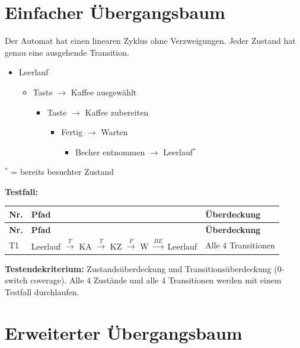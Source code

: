 \documentclass[
	fontsize=12pt,          %
	paper=a4,               %
	numbers=noenddot,       %
	listof=totoc,           %
	listof=entryprefix,     %
	listof=nochaptergap,    %
	bibliography=totoc,     %
	parskip=half,           %
	openany                 %
]{scrbook}
\begin{document}
\section*{Einfacher Übergangsbaum}

Der Automat hat einen linearen Zyklus ohne Verzweigungen.
Jeder Zustand hat genau eine ausgehende Transition.

\begin{itemize}
	\item Leerlauf
	\begin{itemize}
		\item Taste $\rightarrow$ Kaffee ausgewählt
		\begin{itemize}
			\item Taste $\rightarrow$ Kaffee zubereiten
			\begin{itemize}
				\item Fertig $\rightarrow$ Warten
				\begin{itemize}
					\item Becher entnommen $\rightarrow$ Leerlauf$^*$
				\end{itemize}
			\end{itemize}
		\end{itemize}
	\end{itemize}
\end{itemize}

$^*$ = bereits besuchter Zustand

\textbf{Testfall:}

\begin{longtable}{| p{0.5cm} | p{8.0cm} | p{3.5cm} |}
	\hline
	\textbf{Nr.} & \textbf{Pfad} & \textbf{Überdeckung} \\ \hline
	\endfirsthead
	\hline
	\textbf{Nr.} & \textbf{Pfad} & \textbf{Überdeckung} \\ \hline
	\endhead
	\hline
	\endfoot
	T1 & Leerlauf $\xrightarrow{T}$ KA $\xrightarrow{T}$ KZ $\xrightarrow{F}$ W $\xrightarrow{BE}$ Leerlauf & Alle 4 Transitionen \\ \hline
\end{longtable}

\textbf{Testendekriterium:} Zustandsüberdeckung und Transitionsüberdeckung (0-switch coverage).
Alle 4 Zustände und alle 4 Transitionen werden mit einem Testfall durchlaufen.

\section*{Erweiterter Übergangsbaum}
\end{document}

